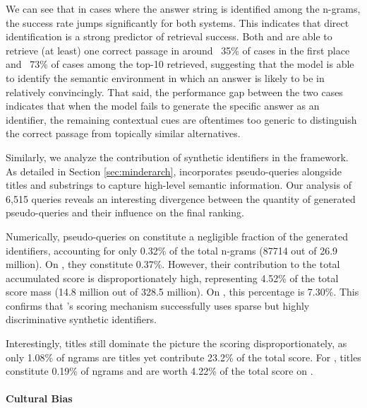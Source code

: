 We can see that in cases where the answer string is identified among the n-grams, the success rate jumps significantly for both systems. This indicates that direct identification is a strong predictor of retrieval success. Both  and  are able to retrieve (at least) one correct passage in around ~35\% of cases in the first place and ~73\% of cases among the top-10 retrieved, suggesting that the model is able to identify the semantic environment in which an answer is likely to be in relatively convincingly. That said, the performance gap between the two cases indicates that when the model fails to generate the specific answer as an identifier, the remaining contextual cues are oftentimes too generic to distinguish the correct passage from topically similar alternatives.

Similarly, we analyze the contribution of synthetic identifiers in the  framework. As detailed in Section \ref{sec:minderarch},  incorporates pseudo-queries alongside titles and substrings to capture high-level semantic information. Our analysis of 6,515 queries reveals an interesting divergence between the quantity of generated pseudo-queries and their influence on the final ranking.

Numerically, pseudo-queries on  constitute a negligible fraction of the generated identifiers, accounting for only 0.32\% of the total n-grams (87714 out of 26.9 million). On , they constitute 0.37\%. However, their contribution to the total accumulated score is disproportionately high, representing 4.52\% of the total score mass (14.8 million out of 328.5 million). On , this percentage is 7.30\%. This confirms that 's scoring mechanism successfully uses sparse but highly discriminative synthetic identifiers. 

Interestingly, titles still dominate the picture the scoring disproportionately, as only 1.08\% of ngrams are titles yet contribute 23.2\% of the total score. For , titles constitute 0.19\% of ngrams and are worth 4.22\% of the total score on .



\paragraph{Cultural Bias}



